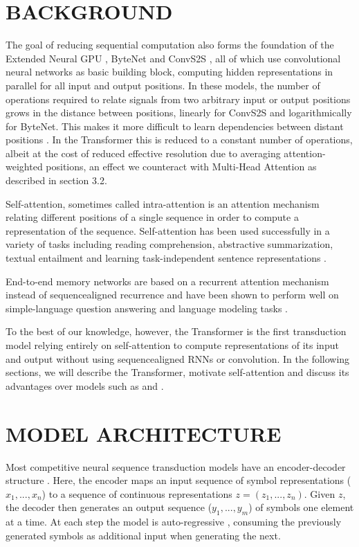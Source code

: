 \documentclass[conference]{IEEEtran}
\begin{document}
\section{BACKGROUND}
The goal of reducing sequential computation also forms the foundation of the Extended Neural GPU \cite{ref16}, ByteNet \cite{ref18} and ConvS2S \cite{ref9}, all of which use convolutional neural networks as basic building block, computing hidden representations in parallel for all input and output positions. In these models, the number of operations required to relate signals from two arbitrary input or output positions grows in the distance between positions, linearly for ConvS2S and logarithmically for ByteNet. This makes it more difficult to learn dependencies between distant positions \cite{ref12}. In the Transformer this is reduced to a constant number of operations, albeit at the cost of reduced effective resolution due to averaging attention-weighted positions, an effect we counteract with Multi-Head Attention as described in section 3.2.

Self-attention, sometimes called intra-attention is an attention mechanism relating different positions of a single sequence in order to compute a representation of the sequence. Self-attention has been used successfully in a variety of tasks including reading comprehension, abstractive summarization, textual entailment and learning task-independent sentence representations \cite{ref4, ref27, ref28, ref22}.

End-to-end memory networks are based on a recurrent attention mechanism instead of sequencealigned recurrence and have been shown to perform well on simple-language question answering and language modeling tasks \cite{ref34}.

To the best of our knowledge, however, the Transformer is the first transduction model relying entirely on self-attention to compute representations of its input and output without using sequencealigned RNNs or convolution. In the following sections, we will describe the Transformer, motivate self-attention and discuss its advantages over models such as \cite{ref17, ref18} and \cite{ref9}.

\section{MODEL ARCHITECTURE}
Most competitive neural sequence transduction models have an encoder-decoder structure \cite{ref5, ref2, ref35}. Here, the encoder maps an input sequence of symbol representations ($x_1,..., x_n$) to a sequence of continuous representations $z = (z_1,..., z_n)$. Given $z$, the decoder then generates an output sequence ($y_1,..., y_m$) of symbols one element at a time. At each step the model is auto-regressive \cite{ref10}, consuming the previously generated symbols as additional input when generating the next.
\end{document}
